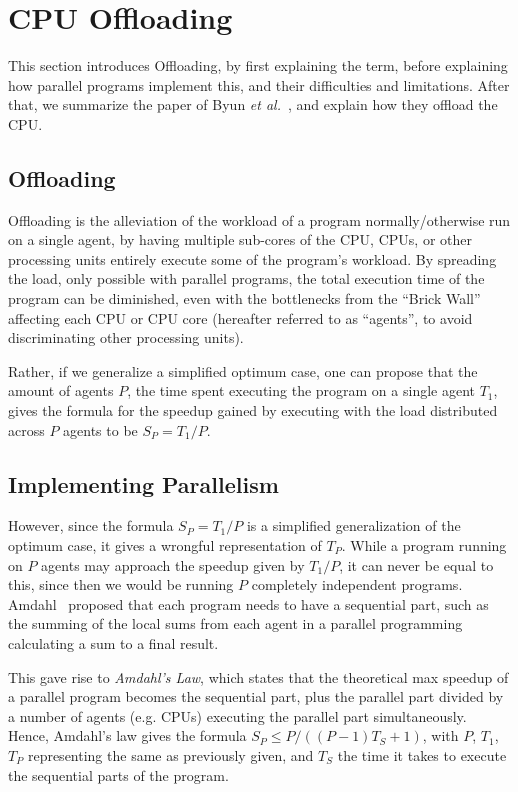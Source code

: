 
\section{CPU Offloading}
\label{sec:offloading}

This section introduces Offloading, by first explaining the term, before explaining how parallel programs implement this, and their difficulties and limitations.
After that, we summarize the paper of Byun \textit{et al.}~\cite{Byun:EECS-2012-215}, and explain how they offload the CPU.

\subsection{Offloading}

Offloading is the alleviation of the workload of a program normally/otherwise run on a single agent, by having multiple sub-cores of the CPU, CPUs, or other processing units entirely execute some of the program's workload.
By spreading the load, only possible with parallel programs, the total execution time of the program can be diminished, even with the bottlenecks from the ``Brick Wall'' affecting each CPU or CPU core (hereafter referred to as ``agents'', to avoid discriminating other processing units).

Rather, if we generalize a simplified optimum case, one can propose that the amount of agents $P$, the time spent executing the program on a single agent $T_1$, gives the formula for the speedup gained by executing with the load distributed across $P$ agents to be $S_P = T_1/P$.

\subsection{Implementing Parallelism}

However, since the formula $S_P = T_1/P$ is a simplified generalization of the optimum case, it gives a wrongful representation of $T_P$.
While a program running on $P$ agents may approach the speedup given by $T_1/P$, it can never be equal to this, since then we would be running $P$ completely independent programs.
Amdahl~\cite{Amdahl:1967:VSP:1465482.1465560} proposed that each program needs to have a sequential part, such as the summing of the local sums from each agent in a parallel programming calculating a sum to a final result.

This gave rise to \textit{Amdahl's Law}, which states that the theoretical max speedup of a parallel program becomes the sequential part, plus the parallel part divided by a number of agents (e.g. CPUs) executing the parallel part simultaneously.
Hence, Amdahl's law gives the formula $S_P \leq P/((P-1)T_S + 1)$, with $P$, $T_1$, $T_P$ representing the same as previously given, and $T_S$ the time it takes to execute the sequential parts of the program.

